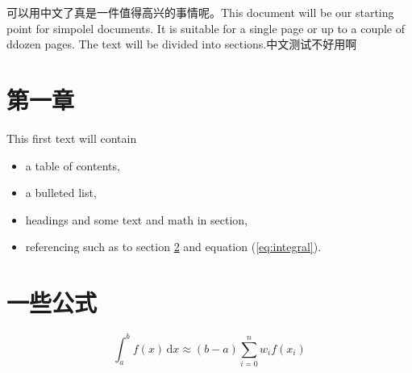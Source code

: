 \documentclass[paper=a4, oneside, fontsize=12pt, parskip=full]{scrartcl}
\begin{document}
\tableofcontents
{}
可以用中文了真是一件值得高兴的事情呢。This document will be our starting point for simpolel documents. It is suitable for a single page or up to a couple of ddozen pages. The text will be divided into sections.中文测试不好用啊

\section{第一章}
This first text will contain
\begin{itemize}
	\item a table of contents,
	\item a bulleted list,
	\item headings and some text and math in section,
	\item referencing such as to section \ref{sec:maths} and equation (\ref{eq:integral}).
\end{itemize}
\section{一些公式}
\label{sec:maths}
\begin{equation}
\label{eq:integral}
	\int_a^b f(x)\,\mathrm{d}x \approx (b-a)
	\sum_{i=0}^n w_i f(x_i)
\end{equation}
\end{document}
